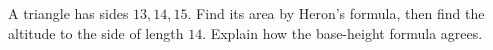 A triangle has sides $13,14,15$. Find its area by Heron's formula, then find the altitude to the side of length $14$. Explain how the base-height formula agrees.
